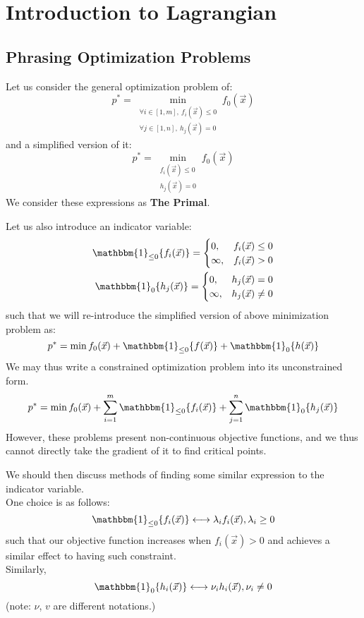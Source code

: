 \section{Introduction to Lagrangian}

\subsection{Phrasing Optimization Problems}
Let us consider the general optimization problem of:
\[
    p^* = \min_{\substack{
        \forall i \in [1, m],\ f_i(\vec{x}) \leq 0 \\
        \forall j \in [1, n],\ h_j(\vec{x}) = 0
    }} f_0 (\vec{x})
\]
and a simplified version of it:
\[
    p^* = \min_{\substack{
        f_i(\vec{x}) \leq 0 \\
        h_j(\vec{x}) = 0
    }} f_0 (\vec{x})
\]
We consider these expressions as \textbf{The Primal}.

Let us also introduce an indicator variable:
\begin{align*}
    \mathbbm{1}_{\leq 0} \{f_i(\vec{x})\} =
    \begin{cases}
        0, &f_i(\vec{x}) \leq 0 \\
        \infty, &f_i(\vec{x}) > 0
    \end{cases} \\
    \mathbbm{1}_{0} \{h_j(\vec{x})\} =
    \begin{cases}
        0, &h_j(\vec{x}) = 0 \\
        \infty, &h_j(\vec{x}) \neq 0
    \end{cases}
\end{align*}
such that we will re-introduce the simplified version of above minimization problem as:
\[
    p^* = \min f_0 (\vec{x}) + \mathbbm{1}_{\leq 0} \{f(\vec{x})\} + \mathbbm{1}_{0} \{h(\vec{x})\}
\]
We may thus write a constrained optimization problem into its unconstrained form. \\
\[
    p^* = \min f_0 (\vec{x}) + \sum_{i = 1}^m \mathbbm{1}_{\leq 0} \{f_i(\vec{x})\} + \sum_{j = 1}^n \mathbbm{1}_{0} \{h_j(\vec{x})\}
\]
However, these problems present non-continuous objective functions, and we thus cannot directly take the gradient of it to find critical points.

We should then discuss methods of finding some similar expression to the indicator variable. \\
One choice is as follows:
\[
    \mathbbm{1}_{\leq 0} \{f_i(\vec{x})\} \longleftrightarrow \lambda_i f_i (\vec{x}), \lambda_i \geq 0
\]
such that our objective function increases when $f_i(\vec{x}) > 0$ and achieves a similar effect to having such constraint. \\
Similarly, 
\[
    \mathbbm{1}_{0} \{h_i(\vec{x})\} \longleftrightarrow \nu_i h_i (\vec{x}), \nu_i \neq 0
\]
(note: $\nu$, $v$ are different notations.)

